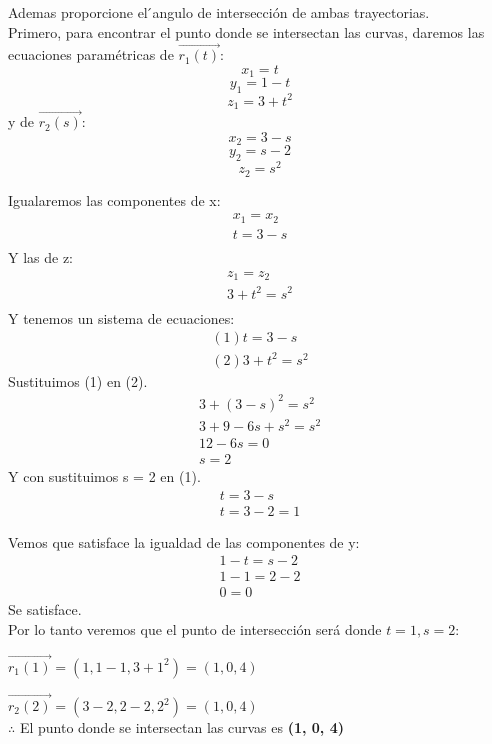 \documentclass[12pt]{article}
\begin{document}
Ademas proporcione el  ́angulo de intersección de ambas trayectorias. \\

Primero, para encontrar el punto donde se intersectan las curvas, daremos las ecuaciones paramétricas de $\vec{r_1(t)}$:
\[ x_1 = t\]
\[ y_1 = 1-t\]
\[ z_1 = 3+t^2\]
y de $\vec{r_2(s)}$:
\[ x_2 = 3-s\]
\[ y_2 = s-2\]
\[ z_2 = s^{2} \]

Igualaremos las componentes de x:
\begin{align*}
   x_1 = x_2 \\
   t =  3-s \\
\end{align*}
Y las de z:
\begin{align*}
   z_1 = z_2 \\
   3+t^2  =  s^{2} \\
\end{align*}
Y tenemos un sistema de ecuaciones:
\begin{align*}
  (1) t =  3-s \\
  (2) 3+t^2  =  s^{2}
\end{align*}
Sustituimos (1) en (2).
\begin{align*}
   3+(3-s)^2  =  s^{2} \\
   3+9-6s+s^2  =  s^{2} \\
   12 -6s =  0 \\
   s = 2
\end{align*}
Y con sustituimos s = 2 en (1).
\begin{align*}
   t =  3-s \\
  t = 3-2 = 1 
\end{align*}

Vemos que satisface la igualdad de las componentes de y:
\begin{align*}
   1-t = s-2 \\
   1-1  = 2-2 \\
   0 = 0
\end{align*}
Se satisface.\\
Por lo tanto veremos que el punto de intersección será donde $t=1, s=2$: \\
\item $\vec{r_1(1)}=(1,1-1,3+1^2) = (1, 0, 4)$

\item $\vec{r_2(2)}=(3-2,2-2,2^2) = (1, 0, 4)$ \\
  
  $\therefore$ El punto donde se intersectan las curvas es \textbf{(1, 0, 4)}
  \\
  
\end{document}
